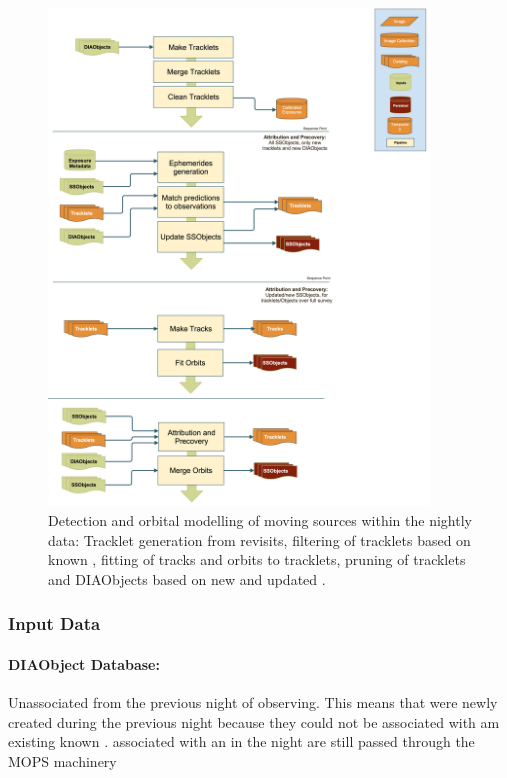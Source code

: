 \begin{figure}[th]
\begin{center}
\includegraphics[width=0.9\textwidth]{figures/MOPS.png}
\caption{\label{fig:apMOPS} Detection and orbital modelling of moving sources within the nightly data: Tracklet generation from revisits, filtering of tracklets based on  known \SSObjects, fitting of tracks and orbits to tracklets, pruning of tracklets and DIAObjects based on new and updated \SSObjects.}
\end{center}
\end{figure} 

\subsubsection{Input Data}

\paragraph*{DIAObject Database: } Unassociated \DIASources from the previous night of observing.  This means \DIAObjects that were newly created during the previous night because they could not be associated with am existing known \DIAObject.  \DIASources associated with an \SSObject in the night are still passed through the MOPS machinery

